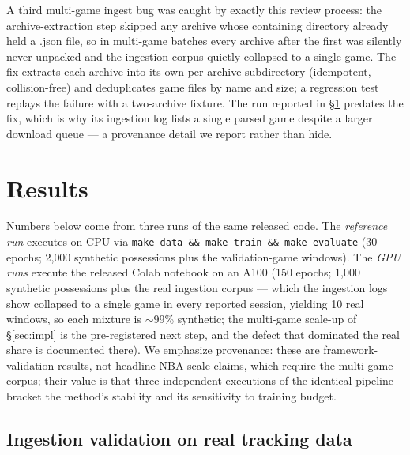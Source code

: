 \documentclass[11pt]{article}
\begin{document}
A third multi-game ingest bug was caught by exactly this review process: the
archive-extraction step skipped any archive whose containing directory
already held a .json file, so in multi-game batches every archive
after the first was silently never unpacked and the ingestion corpus quietly
collapsed to a single game. The fix extracts each archive into its own
per-archive subdirectory (idempotent, collision-free) and deduplicates game
files by name and size; a regression test replays the failure with a
two-archive fixture. The run reported in \S\ref{sec:results} predates the
fix, which is why its ingestion log lists a single parsed game despite a
larger download queue --- a provenance detail we report rather than hide.

\section{Results}
\label{sec:results}

Numbers below come from three runs of the same released code. The
\emph{reference run} executes on CPU via \texttt{make data \&\& make train
\&\& make evaluate} (30 epochs; 2{,}000 synthetic possessions plus the
validation-game windows). The \emph{GPU runs} execute the released Colab
notebook on an A100 (150 epochs; 1{,}000 synthetic possessions plus the real
ingestion corpus --- which the ingestion logs show collapsed to a single
game in every reported session, yielding 10 real windows, so each
mixture is $\sim$99\% synthetic; the multi-game scale-up of
\S\ref{sec:impl} is the pre-registered next step, and the defect that
dominated the real share is documented there). We emphasize provenance:
these are framework-validation results, not headline NBA-scale claims, which
require the multi-game corpus; their value is that three independent executions
of the identical pipeline bracket the method's stability and its sensitivity
to training budget.

\subsection{Ingestion validation on real tracking data}
\label{sec:res-ingest}
\end{document}
